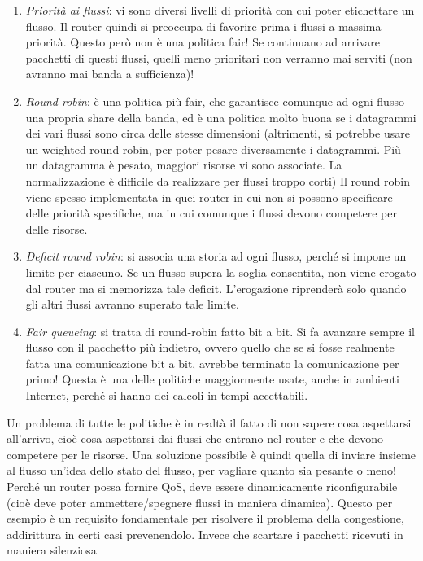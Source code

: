 \begin{enumerate}
 \item \textit{Priorità ai flussi}: vi sono diversi livelli di priorità con cui poter etichettare un flusso. Il router
 quindi si preoccupa di favorire prima i flussi a massima priorità. Questo però non è una politica fair! Se continuano
 ad arrivare pacchetti di questi flussi, quelli meno prioritari non verranno mai serviti (non avranno mai banda a
 sufficienza)!
 \item \textit{Round robin}: è una politica più fair, che garantisce comunque ad ogni flusso una propria share della
 banda, ed è una politica molto buona se i datagrammi dei vari flussi sono circa delle stesse dimensioni (altrimenti,
 si potrebbe usare un weighted round robin, per poter pesare diversamente i datagrammi. Più un datagramma è pesato,
 maggiori risorse vi sono associate. La normalizzazione è difficile da realizzare per flussi troppo corti) Il round
 robin viene spesso implementata in quei router in cui non si possono specificare delle priorità specifiche, ma in 
 cui comunque i flussi devono competere per delle risorse.
 \item \textit{Deficit round robin}: si associa una storia ad ogni flusso, perché si impone un limite per ciascuno. 
 Se un flusso supera la soglia consentita, non viene erogato dal router ma si memorizza tale deficit. L'erogazione
 riprenderà solo quando gli altri flussi avranno superato tale limite.
 \item \textit{Fair queueing}: si tratta di round-robin fatto bit a bit. Si fa avanzare sempre il flusso con il
 pacchetto più indietro, ovvero quello che se si fosse realmente fatta una comunicazione bit a bit, avrebbe terminato 
 la comunicazione per primo! Questa è una delle politiche maggiormente usate, anche in ambienti Internet, perché si
 hanno dei calcoli in tempi accettabili.
\end{enumerate}
Un problema di tutte le politiche è in realtà il fatto di non sapere cosa aspettarsi all'arrivo, cioè cosa aspettarsi
dai flussi che entrano nel router e che devono competere per le risorse. Una soluzione possibile è quindi quella di
inviare insieme al flusso un'idea dello stato del flusso, per vagliare quanto sia pesante o meno!
Perché un router possa fornire QoS, deve essere dinamicamente riconfigurabile (cioè deve poter ammettere/spegnere 
flussi in maniera dinamica). Questo per esempio è un requisito fondamentale per risolvere il problema della 
congestione, addirittura in certi casi prevenendolo. Invece che scartare i pacchetti ricevuti in maniera silenziosa
